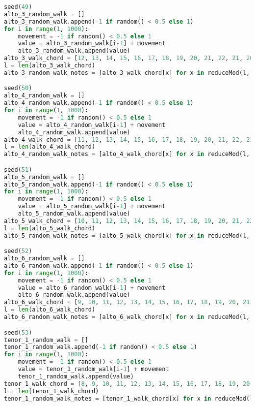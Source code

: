 \begin{lstlisting}[language=Python, caption=Invocation Source Code]
seed(49)
alto_3_random_walk = []
alto_3_random_walk.append(-1 if random() < 0.5 else 1)
for i in range(1, 1000):
    movement = -1 if random() < 0.5 else 1
    value = alto_3_random_walk[i-1] + movement
    alto_3_random_walk.append(value)
alto_3_walk_chord = [12, 13, 14, 15, 16, 17, 18, 19, 20, 21, 22, 21, 20, 19, 18, 17, 16, 15, 14, 13, 12, 11, 10, 9, 8, 7, 6, 5, 4, 3, 2, 1, 0, -1, -2, -1, 0, 1, 2, 3, 4, 5, 6, 7, 8, 9, 10, 11, ]
l = len(alto_3_walk_chord)
alto_3_random_walk_notes = [alto_3_walk_chord[x] for x in reduceMod(l, alto_3_random_walk)]

seed(50)
alto_4_random_walk = []
alto_4_random_walk.append(-1 if random() < 0.5 else 1)
for i in range(1, 1000):
    movement = -1 if random() < 0.5 else 1
    value = alto_4_random_walk[i-1] + movement
    alto_4_random_walk.append(value)
alto_4_walk_chord = [11, 12, 13, 14, 15, 16, 17, 18, 19, 20, 21, 22, 21, 20, 19, 18, 17, 16, 15, 14, 13, 12, 11, 10, 9, 8, 7, 6, 5, 4, 3, 2, 1, 0, -1, -2, -1, 0, 1, 2, 3, 4, 5, 6, 7, 8, 9, 10, ]
l = len(alto_4_walk_chord)
alto_4_random_walk_notes = [alto_4_walk_chord[x] for x in reduceMod(l, alto_4_random_walk)]

seed(51)
alto_5_random_walk = []
alto_5_random_walk.append(-1 if random() < 0.5 else 1)
for i in range(1, 1000):
    movement = -1 if random() < 0.5 else 1
    value = alto_5_random_walk[i-1] + movement
    alto_5_random_walk.append(value)
alto_5_walk_chord = [10, 11, 12, 13, 14, 15, 16, 17, 18, 19, 20, 21, 22, 21, 20, 19, 18, 17, 16, 15, 14, 13, 12, 11, 10, 9, 8, 7, 6, 5, 4, 3, 2, 1, 0, -1, -2, -1, 0, 1, 2, 3, 4, 5, 6, 7, 8, 9, ]
l = len(alto_5_walk_chord)
alto_5_random_walk_notes = [alto_5_walk_chord[x] for x in reduceMod(l, alto_5_random_walk)]

seed(52)
alto_6_random_walk = []
alto_6_random_walk.append(-1 if random() < 0.5 else 1)
for i in range(1, 1000):
    movement = -1 if random() < 0.5 else 1
    value = alto_6_random_walk[i-1] + movement
    alto_6_random_walk.append(value)
alto_6_walk_chord = [9, 10, 11, 12, 13, 14, 15, 16, 17, 18, 19, 20, 21, 22, 21, 20, 19, 18, 17, 16, 15, 14, 13, 12, 11, 10, 9, 8, 7, 6, 5, 4, 3, 2, 1, 0, -1, -2, -1, 0, 1, 2, 3, 4, 5, 6, 7, 8, ]
l = len(alto_6_walk_chord)
alto_6_random_walk_notes = [alto_6_walk_chord[x] for x in reduceMod(l, alto_6_random_walk)]

seed(53)
tenor_1_random_walk = []
tenor_1_random_walk.append(-1 if random() < 0.5 else 1)
for i in range(1, 1000):
    movement = -1 if random() < 0.5 else 1
    value = tenor_1_random_walk[i-1] + movement
    tenor_1_random_walk.append(value)
tenor_1_walk_chord = [8, 9, 10, 11, 12, 13, 14, 15, 16, 17, 18, 19, 20, 21, 22, 21, 20, 19, 18, 17, 16, 15, 14, 13, 12, 11, 10, 9, 8, 7, 6, 5, 4, 3, 2, 1, 0, -1, -2, -1, 0, 1, 2, 3, 4, 5, 6, 7, ]
l = len(tenor_1_walk_chord)
tenor_1_random_walk_notes = [tenor_1_walk_chord[x] for x in reduceMod(l, tenor_1_random_walk)]


\end{lstlisting}
